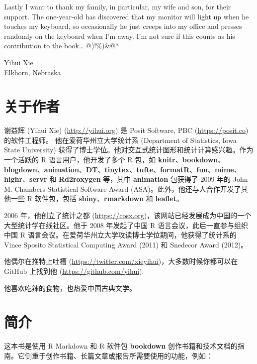 \documentclass[
  12pt,
]{krantz}
\theoremstyle{definition}
\theoremstyle{definition}
\theoremstyle{definition}
\theoremstyle{definition}
\theoremstyle{remark}
\begin{document}
Lastly I want to thank my family, in particular, my wife and son, for their support. The one-year-old has discovered that my monitor will light up when he touches my keyboard, so occasionally he just creeps into my office and presses randomly on the keyboard when I'm away. I'm not sure if this counts as his contribution to the book\ldots{} @)!\%)\&@*

\begin{flushright}
Yihui Xie\\
Elkhorn, Nebraska
\end{flushright}

\chapter*{关于作者}\label{ux5173ux4e8eux4f5cux8005}


谢益辉 (Yihui Xie) (\url{http://yihui.org}) 是 Posit Software, PBC (\url{https://posit.co}) 的软件工程师。 他在爱荷华州立大学统计系 (Department of Statistics, Iowa State University) 获得了博士学位。他对交互式统计图形和统计计算感兴趣。作为一个活跃的 R 语言用户，他开发了多个 R 包，如 \textbf{knitr}、\textbf{bookdown}、\textbf{blogdown}、\textbf{animation}、\textbf{DT}、\textbf{tinytex}、\textbf{tufte}、\textbf{formatR}、\textbf{fun}、\textbf{mime}、\textbf{highr}、\textbf{servr} 和 \textbf{Rd2roxygen} 等，其中 \textbf{animation} 包获得了 2009 年的 John M. Chambers Statistical Software Award (ASA)。此外，他还与人合作开发了其他一些 R 软件包，包括 \textbf{shiny}、\textbf{rmarkdown} 和 \textbf{leaflet}。

2006 年，他创立了统计之都 (\url{https://cosx.org})，该网站已经发展成为中国的一个大型统计学在线社区。他于 2008 年发起了中国 R 语言会议，此后一直参与组织中国 R 语言会议。在爱荷华州立大学攻读博士学位期间，他获得了统计系的 Vince Sposito Statistical Computing Award (2011) 和 Snedecor Award (2012)。

他偶尔在推特上吐槽 (\url{https://twitter.com/xieyihui})，大多数时候你都可以在 GitHub 上找到他 (\url{https://github.com/yihui}).

他喜欢吃辣的食物，也热爱中国古典文学。

\mainmatter

\chapter{简介}\label{introduction}

这本书是使用 R Markdown \citep{R-rmarkdown} 和 R 软件包 \textbf{bookdown} \citep{R-bookdown} 创作书籍和技术文档的指南。它侧重于创作书籍、长篇文章或报告所需要使用的功能，例如：
\end{document}
